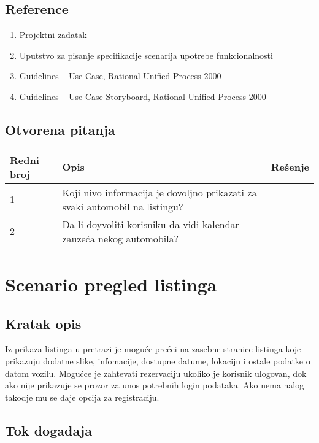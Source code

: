 \documentclass[12pt]{article}
\begin{document}
\subsection{Reference}
\begin{enumerate}
   \item Projektni zadatak
   \item Uputstvo za pisanje specifikacije scenarija upotrebe funkcionalnosti
   \item  Guidelines – Use Case, Rational Unified Process 2000
   \item  Guidelines – Use Case Storyboard, Rational Unified Process 2000
 \end{enumerate}
\subsection{Otvorena pitanja}


\begin{center}
\begin{tabular}{ | m{2cm} | m{7cm}| m{7cm} | } 
\hline
Redni broj& Opis & Rešenje \\ 
\hline
1 & Koji nivo informacija je dovoljno prikazati za svaki automobil na listingu? & \\ 
\hline
2 & Da li doyvoliti korisniku da vidi kalendar zauzeća nekog automobila? & \\
\hline
\end{tabular}
\end{center}

    

\section{Scenario pregled listinga}
\subsection{Kratak opis}
Iz prikaza listinga u pretrazi je moguće prećci na zasebne stranice listinga koje prikazuju dodatne slike, infomacije, dostupne datume, lokaciju i ostale podatke o datom vozilu. Mogućce je zahtevati rezervaciju ukoliko je korisnik ulogovan, dok ako nije prikazuje se prozor za unos potrebnih login podataka. Ako nema nalog takodje mu se daje opcija za registraciju.
\subsection{Tok događaja}
\end{document}

